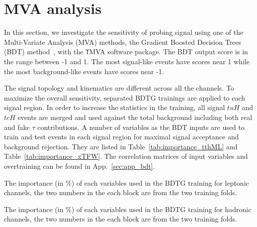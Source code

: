 \section{MVA analysis}
\label{sec:mva}

In this section, we investigate the sensitivity of probing signal using one of the Multi-Variate Analysis (MVA) methods, the Gradient Boosted Decision Trees (BDT) method~\cite{BDT,BDT2}, with the {\texttt TMVA} software package. The BDT output score is in the range between -1 and 1. The most signal-like events have scores near 1 while the most background-like events have scores near -1.

The signal topology and kinematics are different across all the channels. To maximize the overall sensitivity, separated BDTG trainings are applied to each signal region. In order to increase the statistics in the training, all signal $tuH$ and $tcH$ events are merged and used against the total background including
both real and fake $\tau$ contributions.
A number of variables as the BDT inputs are used to train and test events in each signal region for maximal signal acceptance and background rejection. They are listed in Table~\ref{tab:importance_tthML} and Table~\ref{tab:importance_xTFW}. The correlation matrices of input variables and overtraining can be found in
App.~\ref{sec:app_bdt}.

\begin{table}
\caption{The importance (in \%) of each variables used in the BDTG training for leptonic channels, the two numbers in the each block are from the two training folds.}
\label{tab:importance_tthML}
\begin{adjustbox}{center}

\end{adjustbox}
\end{table}


\begin{table}
\caption{The importance (in \%) of each variables used in the BDTG training for hadronic channels, the two numbers in the each block are from the two training folds.}
\label{tab:importance_xTFW}

\end{table}

